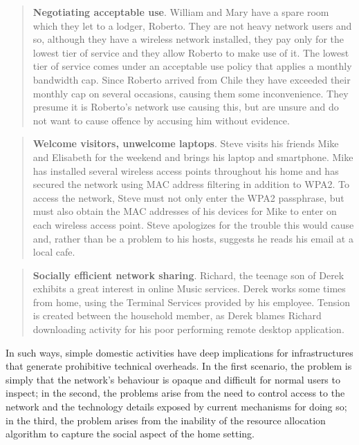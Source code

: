 \begin{quote}
\textbf{Negotiating acceptable use}.  William and Mary have a spare room which
they let to a lodger, Roberto.  They are not heavy network users and so,
although they have a wireless network installed, they pay only for the lowest
tier of service and they allow Roberto to make use of it.  The lowest tier of
service comes under an acceptable use policy that applies a monthly bandwidth
cap.  Since Roberto arrived from Chile they have exceeded their monthly cap on
several occasions, causing them some inconvenience.  They presume it is
Roberto's network use causing this, but are unsure and do not want to cause
offence by accusing him without evidence.
\end{quote}

\begin{quote}
\textbf{Welcome visitors, unwelcome laptops}.  Steve visits his friends Mike and
Elisabeth for the weekend and brings his laptop and smartphone.  Mike has
installed several wireless access points throughout his home and has secured the
network using MAC address filtering in addition to WPA2.  To access the network,
Steve must not only enter the WPA2 passphrase, but must also obtain the MAC
addresses of his devices for Mike to enter on each wireless access point.  Steve
apologizes for the trouble this would cause and, rather than be a problem to his
hosts, suggests he reads his email at a local cafe.
\end{quote}

\begin{quote}
\textbf{Socially efficient network sharing}.  Richard, the teenage son of Derek
exhibits a great interest in online Music services. Derek works some times from
home, using the Terminal Services provided by his employee. Tension is created
between the household member,  as Derek blames Richard downloading activity for
his poor performing remote desktop application. 
\end{quote}

In such ways, simple domestic activities have deep implications for
infrastructures that generate prohibitive technical overheads.  In the first
scenario, the problem is simply that the network's behaviour is opaque and
difficult for normal users to inspect; in the second, the problems arise from
the need to control access to the network and the technology details exposed by
current mechanisms for doing so; in the third, the problem arises from the
inability of the resource allocation algorithm to capture the social aspect of
the home setting.  

